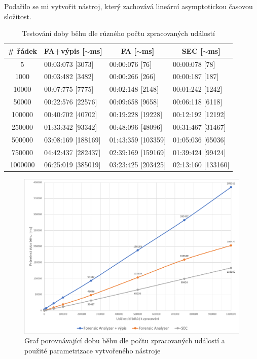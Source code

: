 \documentclass[thesis=B,czech]{FITthesis}[2012/06/26]
\begin{document}
Podařilo se mi vytvořit nástroj, který zachovává lineární asymptotickou časovou složitost.

\newpage

\begin{table}[t]
\centering
\caption{Testování doby běhu dle různého počtu zpracovaných událostí}
\label{testingTable}
\begin{tabular}{|c|l|l|l|}
\hline
\textbf{\# řádek} & \multicolumn{1}{c|}{\textbf{FA+výpis {[}$\sim$ms{]}}} & \multicolumn{1}{c|}{\textbf{FA {[}$\sim$ms{]}}} & \multicolumn{1}{c|}{\textbf{SEC {[}$\sim$ms{]}}} \\ \hline
5 & 00:03:073 {[}3073{]} & 00:00:076 {[}76{]} & 00:00:078 {[}78{]} \\ \hline
1000 & 00:03:482 {[}3482{]} & 00:00:266 {[}266{]} & 00:00:187 {[}187{]} \\ \hline
10000 & 00:07:775 {[}7775{]} & 00:02:148 {[}2148{]} & 00:01:242 {[}1242{]} \\ \hline
50000 & 00:22:576 {[}22576{]} & 00:09:658 {[}9658{]} & 00:06:118 {[}6118{]} \\ \hline
100000 & 00:40:702 {[}40702{]} & 00:19:228 {[}19228{]} & 00:12:192 {[}12192{]} \\ \hline
250000 & 01:33:342 {[}93342{]} & 00:48:096 {[}48096{]} & 00:31:467 {[}31467{]} \\ \hline
500000 & 03:08:169 {[}188169{]} & 01:43:359 {[}103359{]} & 01:05:036 {[}65036{]} \\ \hline
750000 & 04:42:437 {[}282437{]} & 02:39:169 {[}159169{]} & 01:39:424 {[}99424{]} \\ \hline
1000000 & 06:25:019 {[}385019{]} & 03:23:425 {[}203425{]} & 02:13:160 {[}133160{]} \\ \hline
\end{tabular}
\end{table}

\begin{figure}[h]
  \centering
  \includegraphics[width=\textwidth]{res/GraphTestingFA.pdf}
  \caption{Graf porovnávající dobu běhu dle počtu zpracovaných událostí a použité parametrizace vytvořeného nástroje}
  \label{fig:GraphTestingFA}
\end{figure}
\end{document}
